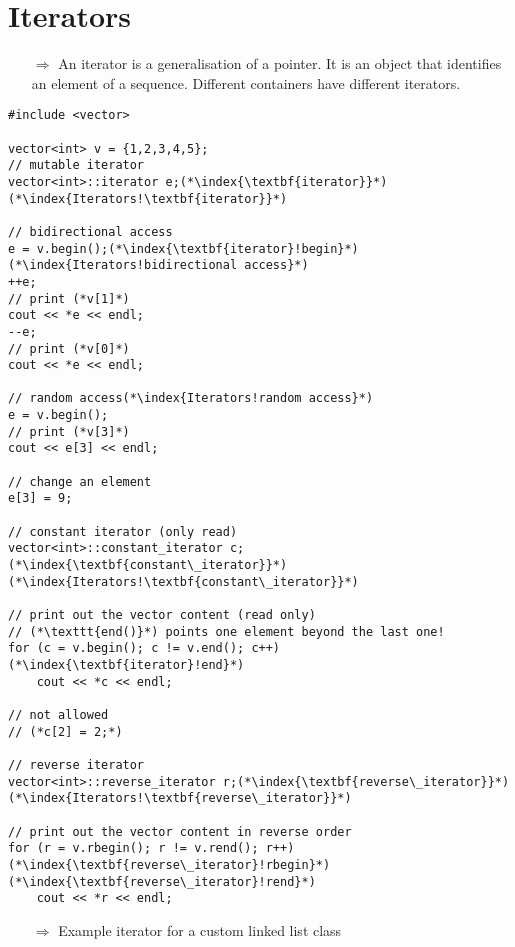 \documentclass[10pt]{article}
\begin{document}
\section{Iterators}
\small
\begin{enumerate}
\item[$\Rightarrow$] An iterator is a generalisation of a pointer. It is an object that identifies an element of a sequence. Different containers have
different iterators.
\end{enumerate}
\begin{lstlisting}
#include <vector>

vector<int> v = {1,2,3,4,5};
// mutable iterator
vector<int>::iterator e;(*\index{\textbf{iterator}}*)(*\index{Iterators!\textbf{iterator}}*)

// bidirectional access
e = v.begin();(*\index{\textbf{iterator}!begin}*)(*\index{Iterators!bidirectional access}*)
++e;
// print (*v[1]*)
cout << *e << endl;
--e;
// print (*v[0]*)
cout << *e << endl;

// random access(*\index{Iterators!random access}*)
e = v.begin();
// print (*v[3]*)
cout << e[3] << endl;

// change an element
e[3] = 9;

// constant iterator (only read)
vector<int>::constant_iterator c;(*\index{\textbf{constant\_iterator}}*)(*\index{Iterators!\textbf{constant\_iterator}}*)

// print out the vector content (read only)
// (*\texttt{end()}*) points one element beyond the last one!
for (c = v.begin(); c != v.end(); c++)(*\index{\textbf{iterator}!end}*)
    cout << *c << endl;

// not allowed
// (*c[2] = 2;*)

// reverse iterator
vector<int>::reverse_iterator r;(*\index{\textbf{reverse\_iterator}}*)(*\index{Iterators!\textbf{reverse\_iterator}}*)

// print out the vector content in reverse order
for (r = v.rbegin(); r != v.rend(); r++)(*\index{\textbf{reverse\_iterator}!rbegin}*)(*\index{\textbf{reverse\_iterator}!rend}*)
    cout << *r << endl;
\end{lstlisting}
\begin{enumerate}
\item[$\Rightarrow$] Example iterator for a custom linked list class
\end{enumerate}
\end{document}
